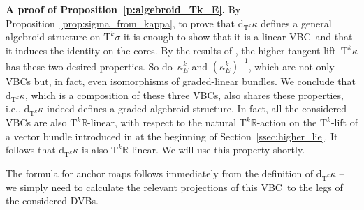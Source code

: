 \documentclass[pdftex]{sigma}
\newcommand{\ZM}{{VBC}} %
\newcommand{\R}{\mathbb{R}}
\newcommand{\dd}{\mathrm{d}}
\newcommand{\TT}[1]{\mathrm{T}^{#1}} %
\numberwithin{equation}{section}
\theoremstyle{definition}
\begin{document}
{\bf A proof of Proposition~\ref{p:algebroid_Tk_E}.} %
By Proposition~\ref{prop:sigma_from_kappa}, to prove that $\dd_{\TT{k}}\kappa$ defines a general algebroid structure on $\TT{k}\sigma$ it is enough to show that it is a linear \ZM\ and that it induces the identity on the cores. By the results of \cite[Theorem~A.5]{MJ_MR_models_high_alg_2015}, the higher tangent lift~$\TT{k}\kappa$ has these two desired properties. So do~$\kappa^k_E$ and $(\kappa^k_E)^{-1}$, which are not only \ZM s but, in fact, even isomorphisms of graded-linear bundles. We conclude that $\dd_{\TT{k}}\kappa$, which is a composition of these three \ZM s, also shares these properties, i.e., $\dd_{\TT{k}}\kappa$ indeed defines a graded algebroid structure. In fact, all the considered \ZM s are also $\TT{k}\R$-linear, with respect to the natural $\TT{k}\R$-action on the $\TT{k}$-lift of a vector bundle introduced in at the beginning of Section~\ref{ssec:higher_lie}. It follows that $\dd_{\TT{k}}\kappa$ is also $\TT{k}\R$-linear. We will use this property shortly.

The formula for anchor maps follows immediately from the definition of $\dd_{\TT{k}}\kappa$ -- we simply need to calculate the relevant projections of this \ZM\ to the legs of the considered DVBs.
\end{document}
